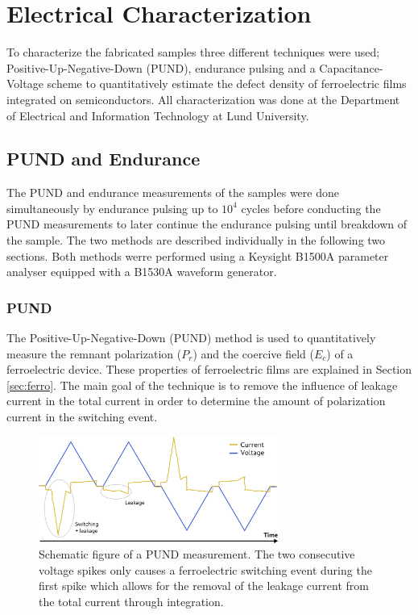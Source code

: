 \documentclass[11pt,twoside]{eitExjobb}
\begin{document}
\chapter{Electrical Characterization}\label{ch:char}

To characterize the fabricated samples three different techniques were used;
Positive-Up-Negative-Down (PUND), endurance pulsing and a Capacitance-Voltage scheme to
quantitatively estimate the defect density of ferroelectric films integrated on
semiconductors. \cite{persson2020method} All characterization was done at the
Department of Electrical and Information Technology at Lund University.

\section{PUND and Endurance}\label{sec:PandE}
The PUND and endurance measurements of the samples were done simultaneously by
endurance pulsing up to $10^4$ cycles before conducting the PUND measurements to
later continue the endurance pulsing until breakdown of the sample. The two
methods are described individually in the following two sections. Both methods
werre performed using a Keysight B1500A parameter analyser equipped with a
B1530A waveform generator.

\subsection{PUND}\label{sec:PUND}
The Positive-Up-Negative-Down (PUND) method is used to quantitatively measure
the remnant polarization ($P_r$) and the coercive field ($E_c$) of a
ferroelectric device. These properties of ferroelectric films are explained in
Section \ref{sec:ferro}. The main goal of the technique is to remove the
influence of leakage current in the total current in order to determine the
amount of polarization current in the switching event.

\begin{figure}[htbp]
    \centering
    \includegraphics[width=0.70\textwidth]{fig/img/PUND.png}
    \caption{Schematic figure of a PUND measurement. The two consecutive
    voltage spikes only causes a ferroelectric switching event during the first
    spike which allows for the removal of the leakage current from the total
    current through integration.}
    \label{fig:char_PUND}
\end{figure}
\end{document}
